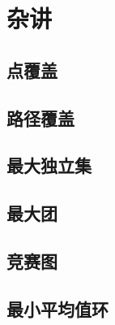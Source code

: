 \section{杂讲}
\subsection{点覆盖}
\subsection{路径覆盖}
\subsection{最大独立集}
\subsection{最大团}
\subsection{竞赛图}
\subsection{最小平均值环}